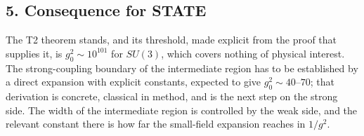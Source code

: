 \documentclass[11pt,a4paper]{article}
\begin{document}
\hypertarget{consequence-for-state}{%
\subsection{5. Consequence for STATE}\label{consequence-for-state}}

The T2 theorem stands, and its threshold, made explicit from the proof
that supplies it, is \(g_0^2\sim10^{101}\) for \(SU(3)\), which covers
nothing of physical interest. The strong-coupling boundary of the
intermediate region has to be established by a direct expansion with
explicit constants, expected to give \(g_0^2\sim40\)--\(70\); that
derivation is concrete, classical in method, and is the next step on the
strong side. The width of the intermediate region is controlled by the
weak side, and the relevant constant there is how far the small-field
expansion reaches in \(1/g^2\).
\end{document}
